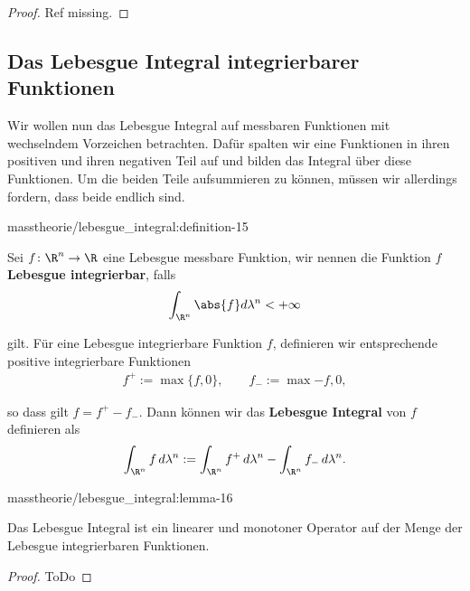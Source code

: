 \documentclass[letterpaper,10pt,german]{jupyterBook}
\begin{document}
\begin{proof}
 Ref missing.
\end{proof}


\subsection{Das Lebesgue Integral integrierbarer Funktionen}
\label{\detokenize{masstheorie/lebesgue_integral:das-lebesgue-integral-integrierbarer-funktionen}}
\par
Wir wollen nun das Lebesgue Integral auf messbaren Funktionen mit wechselndem Vorzeichen betrachten. Dafür spalten wir eine Funktionen in ihren positiven und ihren negativen Teil auf und bilden das Integral über diese Funktionen. Um die beiden Teile aufsummieren zu können, müssen wir allerdings fordern, dass beide endlich sind.
\begin{definition}{}{masstheorie/lebesgue_integral:definition-15}



\par
Sei \(f \colon \R^n \rightarrow \R\) eine Lebesgue messbare Funktion, wir nennen die Funktion \(f\) \textbf{Lebesgue integrierbar}, falls
\begin{align*}
\int_{\R^n} \abs{f} d\lambda^n < +\infty
\end{align*}
\par
gilt. Für eine Lebesgue integrierbare Funktion \(f\), definieren wir entsprechende positive integrierbare Funktionen
\begin{align*}
f^+ := \max \lbrace f, 0 \rbrace, \qquad f_- := \max{-f, 0},
\end{align*}
\par
so dass gilt \(f = f^+ - f_-\). Dann können wir das \textbf{Lebesgue Integral} von \(f\) definieren als
\begin{align*}
\int_{\R^n} f\, d\lambda^n := \int_{\R^n} f^+\, d\lambda^n - \int_{\R^n} f_-\, d\lambda^n.
\end{align*}\end{definition}
\begin{lemma}{}{masstheorie/lebesgue_integral:lemma-16}



\par
Das Lebesgue Integral ist ein linearer und monotoner Operator auf der Menge der Lebesgue integrierbaren Funktionen.
\end{lemma}

\begin{proof}
 ToDo
\end{proof}
\end{document}
